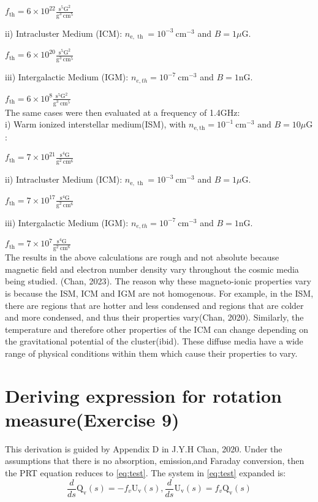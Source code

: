 \documentclass[apj]{emulateapj}
\begin{document}
$f_{\mathrm{th}}=6 \times 10^{22} \frac{\mathrm{s}^5 \mathrm{G^2}}{\mathrm{g}^3 \mathrm{~cm}^5}$

ii) Intracluster Medium (ICM): $n_{\mathrm{e}, \text { th }}=10^{-3} \mathrm{~cm}^{-3}$ and $B=1 \mu \mathrm{G}$.

$f_{\mathrm{th}}=6 \times 10^{20} \frac{\mathrm{s}^5 \mathrm{G^2}}{\mathrm{g}^3 \mathrm{~cm}^5}$

iii) Intergalactic Medium (IGM): $n_{e, t h}=10^{-7} \mathrm{~cm}^{-3}$ and $B=1 \mathrm{nG}$.


$f_{\mathrm{th}}=6 \times 10^{8} \frac{\mathrm{s}^5 \mathrm{G^2}}{\mathrm{g}^3 \mathrm{~cm}^5}$
\\


The same cases were then evaluated at a frequency of 1.4GHz:
\\
i) Warm ionized interstellar medium(ISM), with 
$n_{\mathrm{e}, \mathrm{th}}=10^{-1} \mathrm{~cm}^{-3} \text { and } B=10 \mu \mathrm{G}$: 

$f_{\mathrm{th}}=7 \times 10^{21} \frac{\mathrm{s}^4 \mathrm{G}}{\mathrm{g}^2 \mathrm{~cm}^6}$

ii) Intracluster Medium (ICM): $n_{\mathrm{e}, \text { th }}=10^{-3} \mathrm{~cm}^{-3}$ and $B=1 \mu \mathrm{G}$.

$f_{\mathrm{th}}=7 \times 10^{17} \frac{\mathrm{s}^4 \mathrm{G}}{\mathrm{g}^2 \mathrm{~cm}^6}$


iii) Intergalactic Medium (IGM): $n_{e, t h}=10^{-7} \mathrm{~cm}^{-3}$ and $B=1 \mathrm{nG}$.

$f_{\mathrm{th}}=7 \times 10^{7} \frac{\mathrm{s}^4 \mathrm{G}}{\mathrm{g}^2 \mathrm{~cm}^6}$
\\

The results in the above calculations are rough and not absolute because magnetic field and electron number density vary throughout the cosmic media being studied. (Chan, 2023). The reason why these magneto-ionic properties vary is because the ISM, ICM and IGM are not homogenous. For example, in the ISM, there are regions that are hotter and less condensed and regions that are colder and more condensed, and thus their properties vary(Chan, 2020). Similarly, the temperature and therefore other properties of the ICM can change depending on the gravitational potential of the cluster(ibid). These diffuse media have a wide range of physical conditions within them which cause their properties to vary.
\\
\section{Deriving expression for rotation measure(Exercise 9)}
This derivation is guided by Appendix D in J.Y.H Chan, 2020. Under the assumptions that there is no absorption, emission,and Faraday conversion, then the PRT equation reduces to \eqref{eq:test}. The system in \eqref{eq:test} expanded is: 
$$
\frac{d}{d s} \mathrm{Q}_{\mathrm{v}}(s)=-f_v \mathrm{U}_{\mathrm{v}}(s), \frac{d}{d s} \mathrm{U}_{\mathrm{v}}(s)=f_v \mathrm{Q}_{\mathrm{v}}(s)
$$
\end{document}
